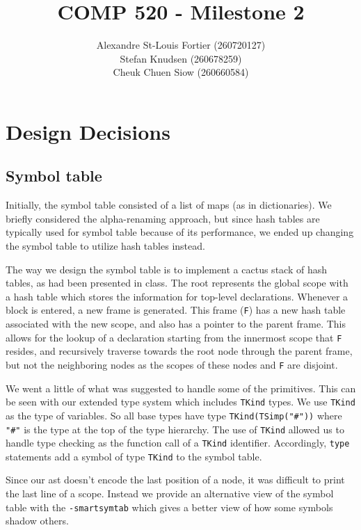 \documentclass{article}
\begin{document}
\title{COMP 520 - Milestone 2}
\author{
Alexandre St-Louis Fortier (260720127)\\
Stefan Knudsen (260678259)\\
Cheuk Chuen Siow (260660584)}
\maketitle

\raggedright
\section*{Design Decisions}
\subsection*{Symbol table}
Initially, the symbol table consisted of a list of maps (as in dictionaries). We briefly considered the alpha-renaming approach, but since hash tables are typically used for symbol table because of its performance, we ended up changing the symbol table to utilize hash tables instead.

The way we design the symbol table is to implement a cactus stack of hash tables, as had been presented in class. The root represents the global scope with a hash table which stores the information for top-level declarations. Whenever a block is entered, a new frame is generated. This frame (\verb|F|) has a new hash table associated with the new scope, and also has a pointer to the parent frame. This allows for the lookup of a declaration starting from the innermost scope that \verb|F| resides, and recursively traverse towards the root node through the parent frame, but not the neighboring nodes as the scopes of these nodes and \verb|F| are disjoint.

We went a little of what was suggested to handle some of the primitives.
This can be seen with our extended type system which includes \verb|TKind| types.
We use \verb|TKind| as the type of variables. So all base types have type \verb|TKind(TSimp("#"))| where \verb|"#"| is the type at the top of the type hierarchy. The use of \verb|TKind| allowed us to handle type checking as the function call of a \verb|TKind| identifier.
Accordingly, \verb|type| statements add a symbol of type \verb|TKind| to the symbol
table.

Since our ast doesn't encode the last position of a node, it was difficult to
print the last line of a scope. Instead we provide an alternative view of the
symbol table with the \verb|-smartsymtab| which gives a better view of how
some symbols shadow others.
\end{document}

